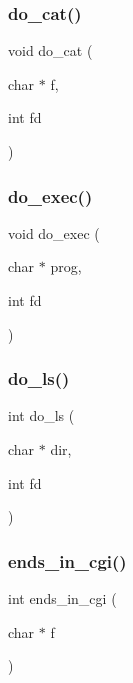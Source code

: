 \subsubsection{\texorpdfstring{do\_cat()}{do\_cat()}}
{\footnotesize\ttfamily void do\+\_\+cat (\begin{DoxyParamCaption}\item[{char $\ast$}]{f,  }\item[{int}]{fd }\end{DoxyParamCaption})}

\mbox{\label{serwer-www_8c_a0a305ff573da158eaa9484e5506921c0}} 
\subsubsection{\texorpdfstring{do\_exec()}{do\_exec()}}
{\footnotesize\ttfamily void do\+\_\+exec (\begin{DoxyParamCaption}\item[{char $\ast$}]{prog,  }\item[{int}]{fd }\end{DoxyParamCaption})}

\mbox{\label{serwer-www_8c_a83999b0603c38aa5fe08f7ed801e6cfe}} 
\subsubsection{\texorpdfstring{do\_ls()}{do\_ls()}}
{\footnotesize\ttfamily int do\+\_\+ls (\begin{DoxyParamCaption}\item[{char $\ast$}]{dir,  }\item[{int}]{fd }\end{DoxyParamCaption})}

\mbox{\label{serwer-www_8c_ad3ef3c593d3a792b02a341450eaa62dd}} 
\subsubsection{\texorpdfstring{ends\_in\_cgi()}{ends\_in\_cgi()}}
{\footnotesize\ttfamily int ends\+\_\+in\+\_\+cgi (\begin{DoxyParamCaption}\item[{char $\ast$}]{f }\end{DoxyParamCaption})}

